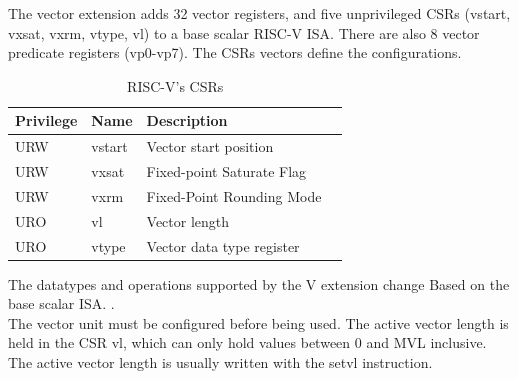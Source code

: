 The vector extension adds 32 vector registers, and five unprivileged CSRs (vstart, vxsat, vxrm, vtype, vl) to a base scalar RISC-V ISA\cite{riscv-v-specs}.
There are also 8 vector predicate registers (vp0-vp7). The CSRs vectors define the configurations.

\begin{table}[H]
    \centering
    \begin{tabular}{|l|l|l|l|}
        \hline
        Privilege & Name   & Description               \\ \hline
        URW       & vstart & Vector start position     \\ \hline
        URW       & vxsat  & Fixed-point Saturate Flag \\ \hline
        URW       & vxrm   & Fixed-Point Rounding Mode \\ \hline
        URO       & vl     & Vector length             \\ \hline
        URO       & vtype  & Vector data type register \\ \hline
    \end{tabular}
    \caption{RISC-V's CSRs}
    \label{CSRs}
\end{table}

The datatypes and operations supported by the V extension change Based on the
base scalar ISA. \cite{riscv-v-specs}.\\


The vector unit must be conﬁgured before being used. 
The active vector length is held in the CSR vl, which can only hold values between 0 and MVL inclusive.
The active vector length is usually written with the setvl instruction.

